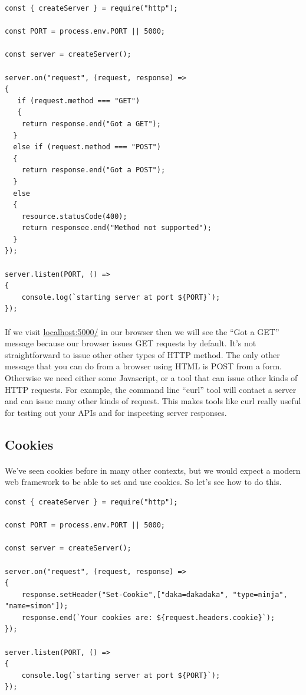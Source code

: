 \documentclass[10pt, a4paper, twosize]{article}
\begin{document}
\begin{lstlisting}
const { createServer } = require("http");

const PORT = process.env.PORT || 5000;

const server = createServer();

server.on("request", (request, response) => 
{
   if (request.method === "GET")
   {
    return response.end("Got a GET");
  } 
  else if (request.method === "POST") 
  {
    return response.end("Got a POST");
  } 
  else
  {
    resource.statusCode(400);
    return responsee.end("Method not supported");
  }
});

server.listen(PORT, () => 
{
    console.log(`starting server at port ${PORT}`);
});
\end{lstlisting}
\paragraph{} If we visit \url{localhost:5000/} in our browser then we will see the ``Got a GET'' message because our browser issues GET requests by default. It's not straightforward to issue other other types of HTTP method. The only other message that you can do from a browser using HTML is POST from a form. Otherwise we need either some Javascript, or a tool that can issue other kinds of HTTP requests. For example, the command line ``curl'' tool will contact a server and can issue many other kinds of request. This makes tools like curl really useful for testing out your APIs and for inspecting server responses.


\subsection{Cookies}
\paragraph{} We've seen cookies before in many other contexts, but we would expect a modern web framework to be able to set and use cookies. So let's see how to do this.

\begin{lstlisting}
const { createServer } = require("http");

const PORT = process.env.PORT || 5000;

const server = createServer();

server.on("request", (request, response) => 
{
    response.setHeader("Set-Cookie",["daka=dakadaka", "type=ninja", "name=simon"]);
    response.end(`Your cookies are: ${request.headers.cookie}`); 
});

server.listen(PORT, () => 
{
    console.log(`starting server at port ${PORT}`);
});
\end{lstlisting}
\end{document}
